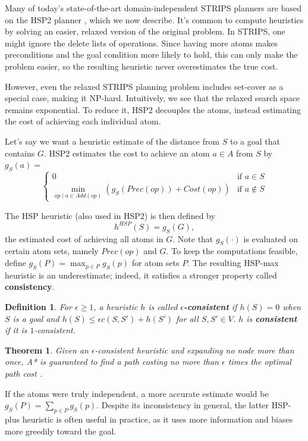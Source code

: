 \documentclass[letterpaper]{article}
\newtheorem{thm}{Theorem}
\newtheorem{defn}{Definition}
\begin{document}
Many of today's state-of-the-art domain-independent STRIPS planners are based on the HSP2 planner \cite{bonet2001planning}, which we now describe.
It's common to compute heuristics by solving an easier, relaxed version of the original problem. In STRIPS, one might ignore the delete lists of operations.
Since having more atoms makes preconditions and the goal condition more likely to hold, this can only make the problem easier, so the resulting heuristic never overestimates the true cost.

However, even the relaxed STRIPS planning problem includes set-cover as a special case, making it NP-hard.
Intuitively, we see that the relaxed search space remains exponential.
To reduce it, HSP2 decouples the atoms, instead estimating the cost of achieving each individual atom.

Let's say we want a heuristic estimate of the distance from $S$ to a goal that contains $G$. HSP2 estimates the cost to achieve an atom $a\in A$ from $S$ by $g_S(a) = $
\[\begin{cases} 0  &\mbox{if } a \in S
\\ \min_{op\mid a\in Add(op)} \left(g_S(Prec(op)) + Cost(op)\right)  &\mbox{if } a \notin S \end{cases}\]

The HSP heuristic (also used in HSP2) is then defined by
\[h^{HSP}(S) = g_S(G),\]
the estimated cost of achieving all atoms in $G$. Note that $g_S(\cdot)$ is evaluated on certain atom sets, namely $Prec(op)$ and $G$.
To keep the computations feasible, define $g_S(P) = \max_{p\in P} g_S(p)$ for atom sets $P$.
The resulting HSP-max heuristic is an underestimate; indeed, it satisfies a stronger property called \textbf{consistency}.

\begin{defn} For $\epsilon\ge 1$, a heuristic $h$ is called \textbf{$\epsilon$-consistent} if $h(S) = 0$ when $S$ is a goal and $h(S) \le \epsilon c(S,S') + h(S')$ for all $S,S'\in V$. $h$ is \textbf{consistent} if it is $1$-consistent. \end{defn}
\begin{thm} Given an $\epsilon$-consistent heuristic and expanding no node more than once, A* is guaranteed to find a path costing no more than $\epsilon$ times the optimal path cost \cite{LikGorThr-ara}. \end{thm}

If the atoms were truly independent, a more accurate estimate would be $g_S(P) = \sum_{p\in P} g_S(p)$.
Despite its inconsistency in general, the latter HSP-plus heuristic is often useful in practice, as it uses more information and biases more greedily toward the goal.
\end{document}
